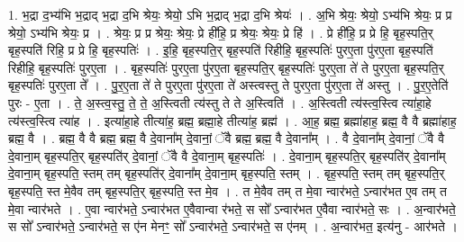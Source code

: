 \documentclass[17pt]{extarticle}
\begin{document}
1. भ॒द्रा द॒भ्य॑भि भ॒द्राद् भ॒द्रा द॒भि श्रेयः॒ श्रेयो॒ ऽभि भ॒द्राद् भ॒द्रा द॒भि श्रेयः॑ । . अ॒भि श्रेयः॒ श्रेयो॒ ऽभ्य॑भि श्रेयः॒ प्र प्र श्रेयो॒ ऽभ्य॑भि श्रेयः॒ प्र । . श्रेयः॒ प्र प्र श्रेयः॒ श्रेयः॒ प्रे ही॑हि॒ प्र श्रेयः॒ श्रेयः॒ प्रे हि॑ । . प्रे ही॑हि॒ प्र प्रे हि॒ बृह॒स्पति॒र् बृह॒स्पति॑ रिहि॒ प्र प्रे हि॒ बृह॒स्पतिः॑ । . इ॒हि॒ बृह॒स्पति॒र् बृह॒स्पति॑ रिहीहि॒ बृह॒स्पतिः॑ पुरए॒ता पु॑रए॒ता बृह॒स्पति॑ रिहीहि॒ बृह॒स्पतिः॑ पुरए॒ता । . बृह॒स्पतिः॑ पुरए॒ता पु॑रए॒ता बृह॒स्पति॒र् बृह॒स्पतिः॑ पुरए॒ता ते॑ ते पुरए॒ता बृह॒स्पति॒र् बृह॒स्पतिः॑ पुरए॒ता ते᳚ । . पु॒र॒ए॒ता ते॑ ते पुरए॒ता पु॑रए॒ता ते॑ अस्त्वस्तु ते पुरए॒ता पु॑रए॒ता ते॑ अस्तु । . पु॒र॒ए॒तेति॑ पुरः - ए॒ता । . ते॒ अ॒स्त्व॒स्तु॒ ते॒ ते॒ अ॒स्त्विती त्य॑स्तु ते ते अ॒स्त्विति॑ । . अ॒स्त्विती त्य॑स्त्व॒स्त्वि त्या॑हा॒हे त्य॑स्त्व॒स्त्वि त्या॑ह । . इत्या॑हा॒हे तीत्या॑ह॒ ब्रह्म॒ ब्रह्मा॒हे तीत्या॑ह॒ ब्रह्म॑ । . आ॒ह॒ ब्रह्म॒ ब्रह्मा॑हाह॒ ब्रह्म॒ वै वै ब्रह्मा॑हाह॒ ब्रह्म॒ वै । . ब्रह्म॒ वै वै ब्रह्म॒ ब्रह्म॒ वै दे॒वाना᳚म् दे॒वानां॒ ॅवै ब्रह्म॒ ब्रह्म॒ वै दे॒वाना᳚म् । . वै दे॒वाना᳚म् दे॒वानां॒ ॅवै वै दे॒वाना॒म् बृह॒स्पति॒र् बृह॒स्पति॑र् दे॒वानां॒ ॅवै वै दे॒वाना॒म् बृह॒स्पतिः॑ । . दे॒वाना॒म् बृह॒स्पति॒र् बृह॒स्पति॑र् दे॒वाना᳚म् दे॒वाना॒म् बृह॒स्पति॒ स्तम् तम् बृह॒स्पति॑र् दे॒वाना᳚म् दे॒वाना॒म् बृह॒स्पति॒ स्तम् । . बृह॒स्पति॒ स्तम् तम् बृह॒स्पति॒र् बृह॒स्पति॒ स्त मे॒वैव तम् बृह॒स्पति॒र् बृह॒स्पति॒ स्त मे॒व । . त मे॒वैव तम् त मे॒वा न्वार॑भते॒ ऽन्वार॑भत ए॒व तम् त मे॒वा न्वार॑भते । . ए॒वा न्वार॑भते॒ ऽन्वार॑भत ए॒वैवान्वा र॑भते॒ स सो᳚ ऽन्वार॑भत ए॒वैवा न्वार॑भते॒ सः । . अ॒न्वार॑भते॒ स सो᳚ ऽन्वार॑भते॒ ऽन्वार॑भते॒ स ए॑न मेनꣳ॒॒ सो᳚ ऽन्वार॑भते॒ ऽन्वार॑भते॒ स ए॑नम् । . अ॒न्वार॑भत॒ इत्य॑नु - आर॑भते । \newline
\end{document}
